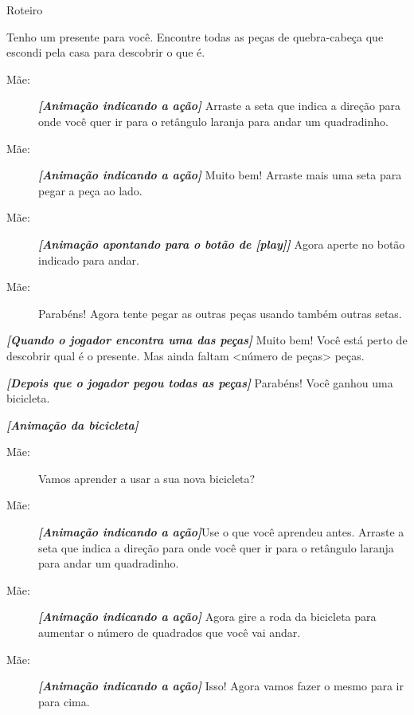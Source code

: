 \begin{description}
	\item Roteiro
	\begin{description}
        \item[Mãe:] Tenho um presente para você. Encontre todas as peças de quebra-cabeça que escondi pela casa para descobrir o que é.
		\item[Treino Setas:]
		\begin{description}
		    \item[]
			\item[Mãe:]\textbf{\textit{[Animação indicando a ação]}} Arraste a seta que indica a direção para onde você quer ir para o retângulo laranja para andar um quadradinho.
			\item[Mãe:]\textbf{\textit{[Animação indicando a ação]}} Muito bem! Arraste mais uma seta para pegar a peça ao lado.
			\item[Mãe:]\textbf{\textit{[Animação apontando para o botão de \textit[play]]}} Agora aperte no botão indicado para andar.
			\item[Mãe:]Parabéns! Agora tente pegar as outras peças usando também outras setas.
		\end{description}
        \item[Mãe:]\textbf{\textit{[Quando o jogador encontra uma das peças]}} Muito bem! Você está perto de descobrir qual é o presente. Mas ainda faltam <número de peças> peças.
		\item[Mãe:]\textbf{\textit{[Depois que o jogador pegou todas as peças]}} Parabéns! Você ganhou uma bicicleta.
        \item \textbf{\textit{[Animação da bicicleta]}}
		\item[Treino da Repetição:]
		\begin{description}
		    \item[]
			\item[Mãe:] Vamos aprender a usar a sua nova bicicleta?
            \item[Mãe:] \textbf{\textit{[Animação indicando a ação]}}Use o que você aprendeu antes. Arraste a seta que indica a direção para onde você quer ir para o retângulo laranja para andar um quadradinho.
            \item[Mãe:] \textbf{\textit{[Animação indicando a ação]}} Agora gire a roda da bicicleta para aumentar o número de quadrados que você vai andar.
            \item[Mãe:] \textbf{\textit{[Animação indicando a ação]}} Isso! Agora vamos fazer o mesmo para ir para cima.

\end{description}
\end{description}
\end{description}
